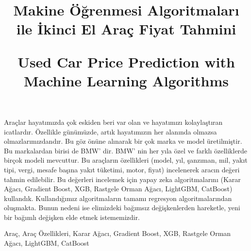 \documentclass[conference]{IEEEtran}
\begin{document}
\IEEEpubid{\makebox[\columnwidth]{\hfill} \hspace{\columnsep}\makebox[\columnwidth]{}}

\title{Makine Öğrenmesi Algoritmaları ile İkinci El Araç Fiyat Tahmini
\\
\*

Used Car Price Prediction with Machine Learning Algorithms
}
\author{
	
\and
{}
}
\maketitle
\thispagestyle{plain}
\pagestyle{plain}
\begin{ozet}
Araçlar hayatımızda çok eskiden beri var olan ve hayatımızı kolaylaştıran icatlardır. Özellikle günümüzde, artık hayatımızın her alanında olmazsa olmazlarımızdandır. Bu göz önüne alınarak bir çok marka ve model üretilmiştir. Bu markalardan birisi de BMW’ dir. BMW’ nin her yıla özel ve farklı özelliklerde birçok modeli mevcuttur. Bu araçların özellikleri (model, yıl, şanzıman, mil, yakıt tipi, vergi, mesafe başına yakıt tüketimi, motor, fiyat) incelenerek aracın değeri tahmin edilebilir. Bu değerleri incelemek için yapay zeka algoritmalarını (Karar Ağacı, Gradient Boost, XGB, Rastgele Orman Ağacı, LightGBM, CatBoost) kullandık. Kullandığımız algoritmaların tamamı regresyon algoritmalarından oluşmakta. Bunun nedeni ise elimizdeki bağımsız değişkenlerden hareketle, yeni bir bağımlı değişken elde etmek istememizdir.
\end{ozet}

\begin{IEEEanahtar}
Araç, Araç Özellikleri, Karar Ağacı, Gradient Boost, XGB, Rastgele Orman Ağacı, LightGBM, CatBoost
\end{IEEEanahtar}
\end{document}
